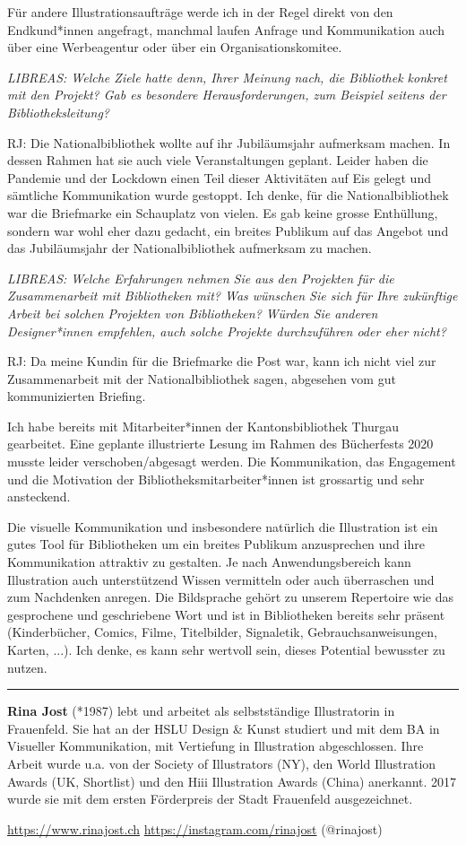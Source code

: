 \documentclass[a4paper,
fontsize=11pt,
oneside,
numbers=noperiodatend,
parskip=half-,
bibliography=totoc,
final
]{scrartcl}
\begin{document}
Für andere Illustrationsaufträge werde ich in der Regel direkt von den
Endkund*innen angefragt, manchmal laufen Anfrage und Kommunikation auch
über eine Werbeagentur oder über ein Organisationskomitee.

\emph{LIBREAS: Welche Ziele hatte denn, Ihrer Meinung nach, die
Bibliothek konkret mit den Projekt? Gab es besondere Herausforderungen,
zum Beispiel seitens der Bibliotheksleitung?}

RJ: Die Nationalbibliothek wollte auf ihr Jubiläumsjahr aufmerksam
machen. In dessen Rahmen hat sie auch viele Veranstaltungen geplant.
Leider haben die Pandemie und der Lockdown einen Teil dieser Aktivitäten
auf Eis gelegt und sämtliche Kommunikation wurde gestoppt. Ich denke,
für die Nationalbibliothek war die Briefmarke ein Schauplatz von vielen.
Es gab keine grosse Enthüllung, sondern war wohl eher dazu gedacht, ein
breites Publikum auf das Angebot und das Jubiläumsjahr der
Nationalbibliothek aufmerksam zu machen.

\emph{LIBREAS: Welche Erfahrungen nehmen Sie aus den Projekten für die
Zusammenarbeit mit Bibliotheken mit? Was wünschen Sie sich für Ihre
zukünftige Arbeit bei solchen Projekten von Bibliotheken? Würden Sie
anderen Designer*innen empfehlen, auch solche Projekte durchzuführen
oder eher nicht?}

RJ: Da meine Kundin für die Briefmarke die Post war, kann ich nicht viel
zur Zusammenarbeit mit der Nationalbibliothek sagen, abgesehen vom gut
kommunizierten Briefing.

Ich habe bereits mit Mitarbeiter*innen der Kantonsbibliothek Thurgau
gearbeitet. Eine geplante illustrierte Lesung im Rahmen des Bücherfests
2020 musste leider verschoben/abgesagt werden. Die Kommunikation, das
Engagement und die Motivation der Bibliotheksmitarbeiter*innen ist
grossartig und sehr ansteckend.

Die visuelle Kommunikation und insbesondere natürlich die Illustration
ist ein gutes Tool für Bibliotheken um ein breites Publikum anzusprechen
und ihre Kommunikation attraktiv zu gestalten. Je nach Anwendungsbereich
kann Illustration auch unterstützend Wissen vermitteln oder auch
überraschen und zum Nachdenken anregen. Die Bildsprache gehört zu
unserem Repertoire wie das gesprochene und geschriebene Wort und ist in
Bibliotheken bereits sehr präsent (Kinderbücher, Comics, Filme,
Titelbilder, Signaletik, Gebrauchsanweisungen, Karten, ...). Ich denke,
es kann sehr wertvoll sein, dieses Potential bewusster zu nutzen.

\begin{center}\rule{0.5\linewidth}{0.5pt}\end{center}

\textbf{Rina Jost} (*1987) lebt und arbeitet als selbstständige
Illustratorin in Frauenfeld. Sie hat an der HSLU Design \& Kunst
studiert und mit dem BA in Visueller Kommunikation, mit Vertiefung in
Illustration abgeschlossen. Ihre Arbeit wurde u.a. von der Society of
Illustrators (NY), den World Illustration Awards (UK, Shortlist) und den
Hiii Illustration Awards (China) anerkannt. 2017 wurde sie mit dem
ersten Förderpreis der Stadt Frauenfeld ausgezeichnet.

\url{https://www.rinajost.ch} \textbar{}
\url{https://instagram.com/rinajost} (@rinajost)
\end{document}
